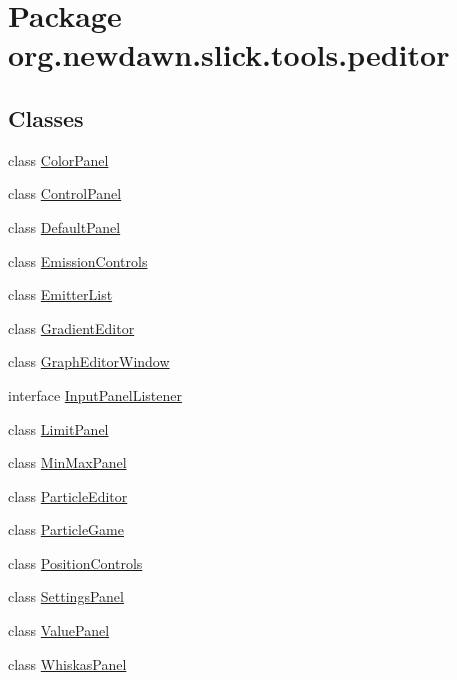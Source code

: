 \hypertarget{namespaceorg_1_1newdawn_1_1slick_1_1tools_1_1peditor}{}\section{Package org.\+newdawn.\+slick.\+tools.\+peditor}
\label{namespaceorg_1_1newdawn_1_1slick_1_1tools_1_1peditor}
\subsection*{Classes}
\begin{DoxyCompactItemize}
\item 
class \mbox{\hyperlink{classorg_1_1newdawn_1_1slick_1_1tools_1_1peditor_1_1_color_panel}{Color\+Panel}}
\item 
class \mbox{\hyperlink{classorg_1_1newdawn_1_1slick_1_1tools_1_1peditor_1_1_control_panel}{Control\+Panel}}
\item 
class \mbox{\hyperlink{classorg_1_1newdawn_1_1slick_1_1tools_1_1peditor_1_1_default_panel}{Default\+Panel}}
\item 
class \mbox{\hyperlink{classorg_1_1newdawn_1_1slick_1_1tools_1_1peditor_1_1_emission_controls}{Emission\+Controls}}
\item 
class \mbox{\hyperlink{classorg_1_1newdawn_1_1slick_1_1tools_1_1peditor_1_1_emitter_list}{Emitter\+List}}
\item 
class \mbox{\hyperlink{classorg_1_1newdawn_1_1slick_1_1tools_1_1peditor_1_1_gradient_editor}{Gradient\+Editor}}
\item 
class \mbox{\hyperlink{classorg_1_1newdawn_1_1slick_1_1tools_1_1peditor_1_1_graph_editor_window}{Graph\+Editor\+Window}}
\item 
interface \mbox{\hyperlink{interfaceorg_1_1newdawn_1_1slick_1_1tools_1_1peditor_1_1_input_panel_listener}{Input\+Panel\+Listener}}
\item 
class \mbox{\hyperlink{classorg_1_1newdawn_1_1slick_1_1tools_1_1peditor_1_1_limit_panel}{Limit\+Panel}}
\item 
class \mbox{\hyperlink{classorg_1_1newdawn_1_1slick_1_1tools_1_1peditor_1_1_min_max_panel}{Min\+Max\+Panel}}
\item 
class \mbox{\hyperlink{classorg_1_1newdawn_1_1slick_1_1tools_1_1peditor_1_1_particle_editor}{Particle\+Editor}}
\item 
class \mbox{\hyperlink{classorg_1_1newdawn_1_1slick_1_1tools_1_1peditor_1_1_particle_game}{Particle\+Game}}
\item 
class \mbox{\hyperlink{classorg_1_1newdawn_1_1slick_1_1tools_1_1peditor_1_1_position_controls}{Position\+Controls}}
\item 
class \mbox{\hyperlink{classorg_1_1newdawn_1_1slick_1_1tools_1_1peditor_1_1_settings_panel}{Settings\+Panel}}
\item 
class \mbox{\hyperlink{classorg_1_1newdawn_1_1slick_1_1tools_1_1peditor_1_1_value_panel}{Value\+Panel}}
\item 
class \mbox{\hyperlink{classorg_1_1newdawn_1_1slick_1_1tools_1_1peditor_1_1_whiskas_panel}{Whiskas\+Panel}}
\end{DoxyCompactItemize}
